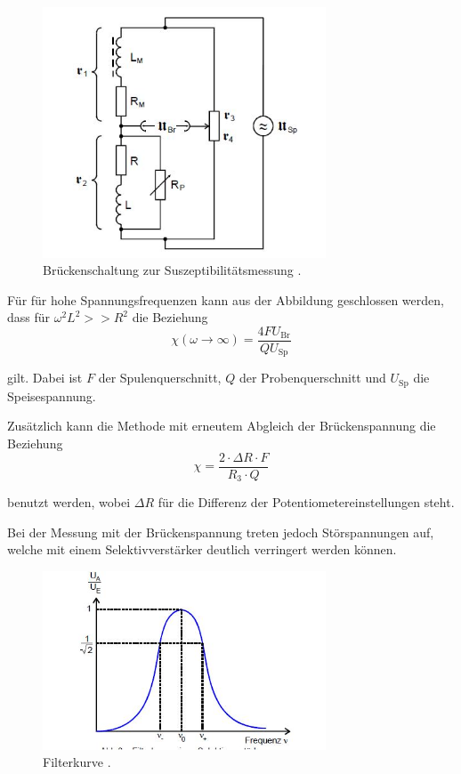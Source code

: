 \begin{figure}[H]
        \centering
        \includegraphics[width=0.75\textwidth]{Bilder/MessBruecke.JPG}
        \caption{Brückenschaltung zur Suszeptibilitätsmessung \cite{V606}.}
        \label{fig:bruecke}
\end{figure}

\noindent
Für für hohe Spannungsfrequenzen kann aus der Abbildung geschlossen werden, dass für $\omega^2 L^2 >> R^2$ die Beziehung 
\begin{equation}
    \chi (\omega \to \infty) = \frac{4 F U_\text{Br}}{Q U_\text{Sp}} 
    \label{eqn:spannung}
\end{equation}

\noindent 
gilt. Dabei ist  $F$ der Spulenquerschnitt, $Q$ der Probenquerschnitt und $U_\text{Sp}$ die Speisespannung.

\noindent
Zusätzlich kann die Methode mit erneutem Abgleich der Brückenspannung die Beziehung 
\begin{equation}
    \chi = \frac{2 \cdot \Delta R \cdot F}{R_3\cdot Q}
    \label{eqn:alternativ}
\end{equation}

benutzt werden, wobei $\Delta R$ für die Differenz der Potentiometereinstellungen steht.


Bei der Messung mit der Brückenspannung treten jedoch Störspannungen auf, welche mit einem Selektivverstärker deutlich verringert werden können. 
\begin{figure}[H]
        \centering
        \includegraphics[width=0.75\textwidth]{Bilder/Kurve.jpg}
        \caption{Filterkurve \cite{V606}.}
        \label{fig:filterkurve2}
\end{figure}

